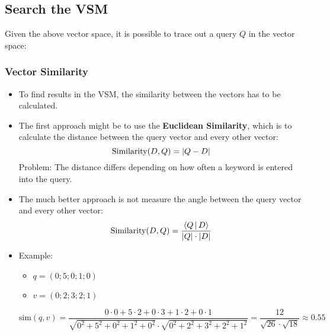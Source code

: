 		\subsection{Search the VSM} %
			Given the above vector space, it is possible to trace out a query \(Q\) in the vector space:
			\begin{figure}[H]
				\centering
			\end{figure}

			\subsubsection{Vector Similarity} %
				\begin{itemize}
					\item To find results in the VSM, the similarity between the vectors has to be calculated.
					\item The first approach might be to use the \textbf{Euclidean Similarity}, which is to calculate the distance between the query vector and every other vector:
						\begin{equation*}
							\text{Similarity}(D, Q) = \abs{Q - D}
						\end{equation*}
						Problem: The distance differs depending on how often a keyword is entered into the query.
					\item The much better approach is not measure the angle between the query vector and every other vector:
						\begin{equation*}
							\text{Similarity}(D, Q) = \frac{\langle Q \,\vert\, D \rangle}{\abs{Q} \cdot \abs{D}}
						\end{equation*}
					\item Example:
						\begin{itemize}
							\item \(q = (0;5;0;1;0)\)
							\item \(v = (0;2;3;2;1)\)
						\end{itemize}
						\begin{equation*}
							\text{sim}(q,v) = \frac{0 \cdot 0 + 5 \cdot 2 + 0 \cdot 3 + 1 \cdot 2 + 0 \cdot 1}{\sqrt{0^2 + 5^2 + 0^2 + 1^2 + 0^2} \cdot \sqrt{0^2 + 2^2 + 3^2 +2^2 + 1^2}}
							= \frac{12}{\sqrt{26} \cdot \sqrt{18}} \approx 0.55
						\end{equation*}

				\end{itemize}

